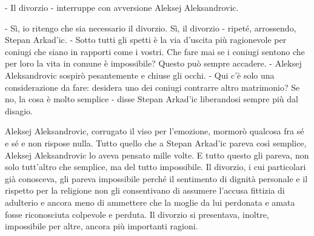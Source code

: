 - Il divorzio - interruppe con avversione Aleksej Aleksandrovic. 

- Sì, io ritengo che sia necessario il divorzio. Sì, il divorzio - ripeté, arrossendo, Stepan Arkad'ic. - Sotto tutti gli spetti è la via d'uscita più ragionevole per coniugi che siano in rapporti come i vostri. Che fare mai se i coniugi sentono che per loro la vita in comune è impossibile? Questo può sempre accadere. - Aleksej Aleksandrovic sospirò pesantemente e chiuse gli occhi. - Qui c'è solo una considerazione da fare: desidera uno dei coniugi contrarre altro matrimonio? Se no, la cosa è molto semplice - disse Stepan Arkad'ic liberandosi sempre più dal disagio. 

Aleksej Aleksandrovic, corrugato il viso per l'emozione, mormorò qualcosa fra sé e sé e non rispose nulla. Tutto quello che a Stepan Arkad'ic pareva così semplice, Aleksej Aleksandrovic lo aveva pensato mille volte. E tutto questo gli pareva, non solo tutt'altro che semplice, ma del tutto impossibile. Il divorzio, i cui particolari già conosceva, gli pareva impossibile perché il sentimento di dignità personale e il rispetto per la religione non gli consentivano di assumere l'accusa fittizia di adulterio e ancora meno di ammettere che la moglie da lui perdonata e amata fosse riconosciuta colpevole e perduta. Il divorzio si presentava, inoltre, impossibile per altre, ancora più importanti ragioni. 

